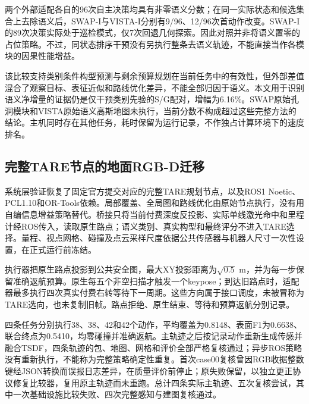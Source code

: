\documentclass[11pt,a4paper]{article}
\begin{document}
两个外部适配各自的96次自主决策均具有非零语义分数；在同一实际状态和候选集合上去除语义后，SWAP-I与VISTA-I分别有9/96、12/96次首动作改变。SWAP-I的89次决策实际处于巡检模式，仅7次回退几何探索。因此对照并非将语义置零的占位策略。不过，同状态排序干预没有另执行整条去语义轨迹，不能直接当作各模块的因果性能增益。

该比较支持类别条件构型预测与剩余预算规划在当前任务中的有效性，但外部差值混合了观察目标、表征近似和路线优化差异，不能全部归因于语义。本文用于识别语义净增量的证据仍是仅干预类别先验的S/G配对，增幅为6.16\%。SWAP原始孔洞模块和VISTA原始语义高斯地图未执行，当前分数不构成超过这些完整方法的结论。主机同时存在其他任务，耗时保留为运行记录，不作独占计算环境下的速度排名。

\subsection{完整TARE节点的地面RGB-D迁移}
系统层验证恢复了固定官方提交对应的完整TARE规划节点，以及ROS1 Noetic、PCL1.10和OR-Tools依赖。局部覆盖、全局图和路线优化由原始节点执行，没有用自编信息增益策略替代。桥接只将当前付费深度反投影、实际单线激光命中和里程计经ROS传入，读取原生路点；语义类别、真实构型和最终评分不进入TARE选择。量程、视点网格、碰撞及点云采样尺度依据公共传感器与机器人尺寸一次性设置，在正式运行前冻结。

执行器把原生路点投影到公共安全图，最大XY投影距离为$\sqrt{0.5}$ m，并为每一步保留准确返航预算。原生每五个非空扫描才触发一个keypose；到达旧路点时，适配器最多执行四次真实付费右转等待下一周期。这些方向属于接口调度，未被冒称为TARE选向，也未复制旧帧。路点拒绝、原生结束、等待和预算返航分别记录。

\begin{table}[htbp]
\centering\small
\caption{完整TARE节点迁移的四条实际轨迹。$N_{\rm native}$为执行原生目标的动作，$N_{\rm wait}$与$N_{\rm return}$为适配器等待和保护返航动作；加上共同前缀18步等于总动作数。全部任务满足覆盖、安全与返航资格。该表不与共同CPU机制表混作完整方法性能排名。}
\label{tab:tare_transfer}
\begingroup\setlength{\tabcolsep}{4pt}

\endgroup
\end{table}

四条任务分别执行38、38、42和42个动作，平均覆盖为0.8148、表面F1为0.6638、联合终点为0.5410，均零碰撞并准确返航。主轨迹之后按记录动作重新生成传感并融合TSDF，四条轨迹的包、地图、网格和评价全部严格复核通过；异步ROS策略没有重新执行，不能称为完整策略确定性重复。首次case00复核曾因RGB收据整数键经JSON转换而误报日志差异，在质量评价前停止；原失败保留，以独立更正协议修复比较器，复用原主轨迹而未重跑。总计四条实际主轨迹、五次复核尝试，其中一次基础设施比较失败、四次完整感知与建图复核通过。
\end{document}
